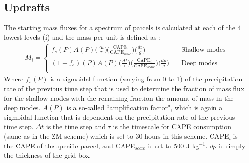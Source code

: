 \documentclass[letterpaper,12pt,titlepage,oneside,final]{book}
\begin{document}
\subsection{Updrafts}
The starting mass fluxes for a spectrum of parcels is calculated at each of the 4 lowest levels (i) and the mass per unit is defined as \citep{folkins_simple_2014}:
\begin{align}\label{eq:zmm}
M_{i} = 
     \begin{cases}
       f_{s}(P)A(P)\big(\frac{\Delta{t}}{\tau}\big)\big(\frac{\text{CAPE}_{i}}{\text{CAPE}_{scale}}\big)\big(\frac{dp}{g}\big) &\quad\text{Shallow modes}\\
      (1-f_{s})(P)A(P)\big(\frac{\Delta{t}}{\tau}\big)\big(\frac{\text{CAPE}_{i}}{\text{CAPE}_{scale}}\big)\big(\frac{dp}{g}\big) &\quad\text{Deep modes}\\
     \end{cases}
\end{align}
Where $f_{s}(P)$ is a sigmoidal function (varying from 0 to 1) of the precipitation rate of the previous time step that is used to determine the fraction of mass flux for the shallow modes with the remaining fraction the amount of mass in the deep modes. $A(P)$ is a so-called ``amplification factor", which is again a sigmoidal function that is dependent on the precipitation rate of the previous time step. $\Delta{t}$ is the time step and $\tau$ is the timescale for CAPE consumption (same as in the ZM scheme) which is set to 30 hours in this scheme. CAPE$_{i}$ is the CAPE of the specific parcel, and CAPE$_{scale}$ is set to 500 J kg$^{-1}$. $dp$ is simply the thickness of the grid box.
\end{document}
